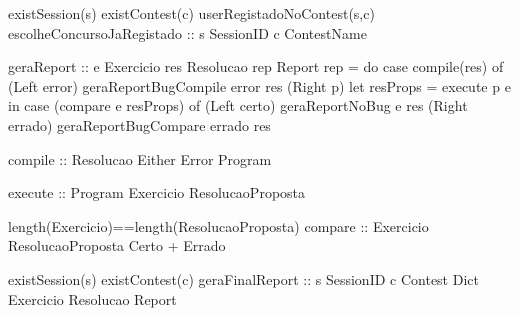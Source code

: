 \prop
{ existSession(s) \wedge existContest(c) \wedge userRegistadoNoContest(s,c) }
{escolheConcursoJaRegistado :: s \unif SessionID \rarrow c \unif ContestName }
{ }

\prop
{ }
{geraReport :: e \unif Exercicio \rarrow res \unif Resolucao \rarrow rep \unif Report}
{ rep = do
             case compile(res) of
                 (Left error) \rarrow geraReportBugCompile error res
                 (Right p) \rarrow let resProps = execute p e
                                  in case (compare e resProps) of
                                      (Left certo) \rarrow geraReportNoBug e res
                                      (Right errado) \rarrow geraReportBugCompare errado res
}


\prop
{ }
{compile :: Resolucao \rarrow Either Error Program}
{ }


\prop
{ }
{execute :: Program \rarrow Exercicio \rarrow ResolucaoProposta}
{ }

\prop
{ length(Exercicio)==length(ResolucaoProposta)}
{compare :: Exercicio \rarrow ResolucaoProposta \rarrow Certo + Errado}
{ }

\prop
{ existSession(s) \wedge existContest(c) \wedge }
{geraFinalReport :: s \unif SessionID \rarrow c \unif Contest \rarrow Dict Exercicio Resolucao \rarrow Report}
{ }
